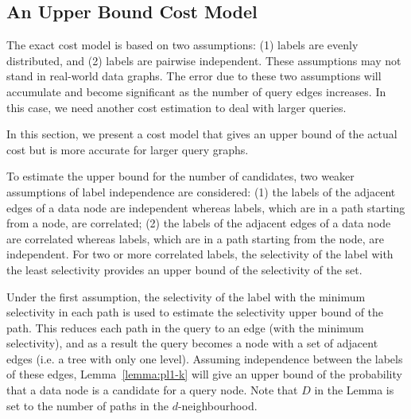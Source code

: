 \documentclass{sigmod}
\begin{document}
%

\subsection{An Upper Bound Cost Model}
\label{sec:ub}
The exact cost model is based on two assumptions: (1) labels are evenly distributed, and (2) labels are pairwise independent. These assumptions may not stand in real-world data graphs. The error due to these two assumptions will accumulate and become significant as the number of query edges increases. In this case, we need another cost estimation to deal with larger queries.

In this section, we present a cost model that gives an upper bound of the actual cost but is more accurate for larger query graphs. 

To estimate the upper bound for the number of candidates, two weaker assumptions of label independence are considered: (1) the labels of the adjacent edges of a data node are independent whereas labels, which are in a path starting from a node, are correlated; (2) the labels of the adjacent edges of a data node are correlated whereas labels, which are in a path starting from the node, are independent. For two or more correlated labels, the selectivity of the label with the least selectivity provides an upper bound of the selectivity of the set. 

Under the first assumption, the selectivity of the label with the minimum selectivity in each path is used  to estimate the selectivity upper bound of the path. This reduces each path in the query to an edge (with the minimum selectivity), and as a result the query becomes a node with a set of adjacent edges (i.e. a tree with only one level). Assuming independence between the labels of these edges, Lemma~\ref{lemma:pl1-k} will give an upper bound of  the probability that a data node is a candidate for a query node. Note that $D$ in the Lemma is set to the number of paths in the $d$-neighbourhood. 
\end{document}
